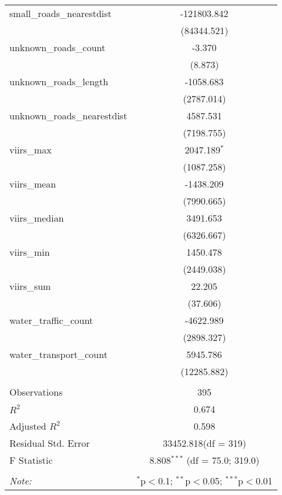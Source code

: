 \begin{table}[!htbp]
\begin{tabular}{@{\extracolsep{5pt}}lc}
 small_roads_nearestdist & -121803.842$^{}$ \\
  & (84344.521) \\
 unknown_roads_count & -3.370$^{}$ \\
  & (8.873) \\
 unknown_roads_length & -1058.683$^{}$ \\
  & (2787.014) \\
 unknown_roads_nearestdist & 4587.531$^{}$ \\
  & (7198.755) \\
 viirs_max & 2047.189$^{*}$ \\
  & (1087.258) \\
 viirs_mean & -1438.209$^{}$ \\
  & (7990.665) \\
 viirs_median & 3491.653$^{}$ \\
  & (6326.667) \\
 viirs_min & 1450.478$^{}$ \\
  & (2449.038) \\
 viirs_sum & 22.205$^{}$ \\
  & (37.606) \\
 water_traffic_count & -4622.989$^{}$ \\
  & (2898.327) \\
 water_transport_count & 5945.786$^{}$ \\
  & (12285.882) \\
\hline \\[-1.8ex]
 Observations & 395 \\
 $R^2$ & 0.674 \\
 Adjusted $R^2$ & 0.598 \\
 Residual Std. Error & 33452.818(df = 319)  \\
 F Statistic & 8.808$^{***}$ (df = 75.0; 319.0) \\
\hline
\hline \\[-1.8ex]
\textit{Note:} & \multicolumn{1}{r}{$^{*}$p$<$0.1; $^{**}$p$<$0.05; $^{***}$p$<$0.01} \\
\end{tabular}
\end{table}
